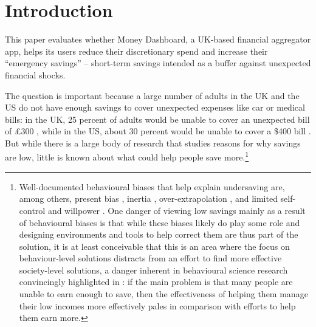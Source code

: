 
\section{Introduction}%
\label{sec:introduction}

This paper evaluates whether Money Dashboard, a UK-based financial aggregator
app, helps its users reduce their discretionary spend and increase their
``emergency savings'' -- short-term savings intended as a buffer against
unexpected financial shocks.

The question is important because a large number of adults in the UK and the US
do not have enough savings to cover unexpected expenses like car or medical
bills: in the UK, 25 percent of adults would be unable to cover an unexpected
bill of \pounds300 \citep{phillips2021supporting}, while in the US, about 30
percent would be unable to cover a \$400 bill \citep{fed2022economic}. But
while there is a large body of research that studies reasons for why savings
are low, little is known about what could help people save
more.\footnote{Well-documented behavioural biases that help explain undersaving
    are, among others, present bias \citep{laibson1997golden,
    ericson2019intertemporal}, inertia \citep{madrian2001power},
    over-extrapolation \citep{choi2009reinforcement}, and limited self-control
    and willpower \citep{thaler1981economic, benhabib2005modeling,
    fudenberg2006dual, loewenstein2004animal, gul2001temptation}. One danger of
    viewing low savings mainly as a result of behavioural biases is that while
    these biases likely do play some role and designing environments and tools
    to help correct them are thus part of the solution, it is at least
    conceivable that this is an area where the focus on behaviour-level
    solutions distracts from an effort to find more effective society-level
    solutions, a danger inherent in behavioural science research convincingly
    highlighted in \citet{chater2022frame}: if the main problem is that many
people are unable to earn enough to save, then the effectiveness of helping
them manage their low incomes more effectively pales in comparison with efforts
to help them earn more.}

